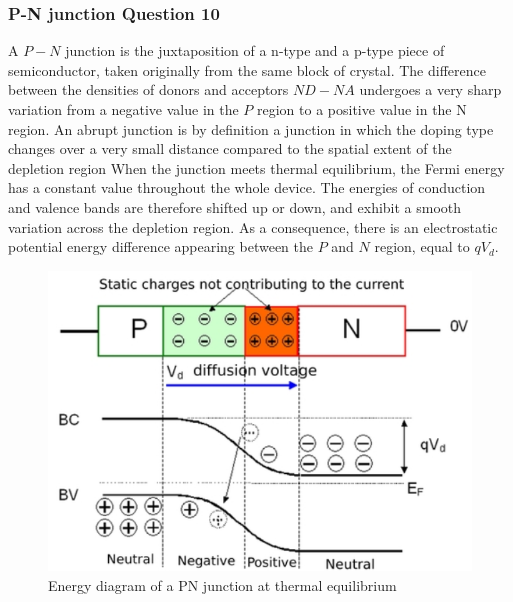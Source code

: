 \subsubsection*{P-N junction Question 10}

A $P-N$ junction is the juxtaposition of a n-type and a p-type piece of semiconductor, taken originally from the same block of crystal. The difference between the densities of donors and acceptors $ND - NA$ undergoes a very sharp variation from a negative value in the $P$ region to a positive value in the N region. An abrupt junction is by definition a junction in which the doping type changes over a very small distance compared to the spatial extent of the depletion region
When the junction meets thermal equilibrium, the Fermi energy has a constant value throughout the whole device. The energies of conduction and valence bands are therefore shifted up or down, and exhibit a smooth variation across the depletion region. As a consequence, there is an electrostatic potential energy difference appearing between the $P$ and $N$ region, equal to $qV_d$.

\begin{figure}[H]
  \centering
  \includegraphics[width=0.35\linewidth]{Graphics/Chapter3/PNjunction.PNG}
  \caption{Energy diagram of a PN junction at thermal equilibrium\cite{PN}}
  \label{fig:PNjunction}
\end{figure}

